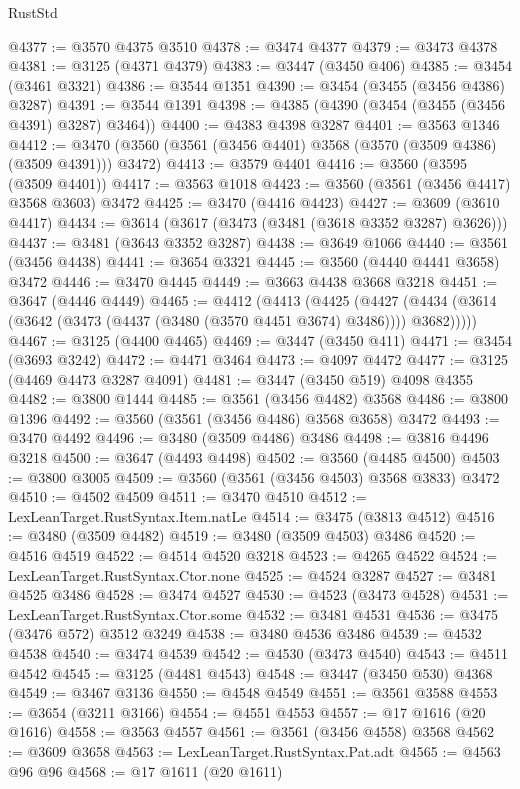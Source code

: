 \begin{lexlean}{RustStd}
\begin{coremodule}
{\begin{coremodule}
{{{{{{{{{{{{{{{{{{{{{{{{{{{{{{{{{{{{{{{{{{{{{@4377 := @3570 @4375 @3510
@4378 := @3474 @4377
@4379 := @3473 @4378
@4381 := @3125 (@4371 @4379)
@4383 := @3447 (@3450 @406)
@4385 := @3454 (@3461 @3321)
@4386 := @3544 @1351
@4390 := @3454 (@3455 (@3456 @4386) @3287)
@4391 := @3544 @1391
@4398 := @4385 (@4390 (@3454 (@3455 (@3456 @4391) @3287) @3464))
@4400 := @4383 @4398 @3287
@4401 := @3563 @1346
@4412 := @3470 (@3560 (@3561 (@3456 @4401) @3568 (@3570 (@3509 @4386) (@3509 @4391))) @3472)
@4413 := @3579 @4401
@4416 := @3560 (@3595 (@3509 @4401))
@4417 := @3563 @1018
@4423 := @3560 (@3561 (@3456 @4417) @3568 @3603) @3472
@4425 := @3470 (@4416 @4423)
@4427 := @3609 (@3610 @4417)
@4434 := @3614 (@3617 (@3473 (@3481 (@3618 @3352 @3287) @3626)))
@4437 := @3481 (@3643 @3352 @3287)
@4438 := @3649 @1066
@4440 := @3561 (@3456 @4438)
@4441 := @3654 @3321
@4445 := @3560 (@4440 @4441 @3658) @3472
@4446 := @3470 @4445
@4449 := @3663 @4438 @3668 @3218
@4451 := @3647 (@4446 @4449)
@4465 := @4412
    (@4413
      (@4425
        (@4427 (@4434 (@3614 (@3642 (@3473 (@4437 (@3480 (@3570 @4451 @3674) @3486)))) @3682)))))
@4467 := @3125 (@4400 @4465)
@4469 := @3447 (@3450 @411)
@4471 := @3454 (@3693 @3242)
@4472 := @4471 @3464
@4473 := @4097 @4472
@4477 := @3125 (@4469 @4473 @3287 @4091)
@4481 := @3447 (@3450 @519) @4098 @4355
@4482 := @3800 @1444
@4485 := @3561 (@3456 @4482) @3568
@4486 := @3800 @1396
@4492 := @3560 (@3561 (@3456 @4486) @3568 @3658) @3472
@4493 := @3470 @4492
@4496 := @3480 (@3509 @4486) @3486
@4498 := @3816 @4496 @3218
@4500 := @3647 (@4493 @4498)
@4502 := @3560 (@4485 @4500)
@4503 := @3800 @3005
@4509 := @3560 (@3561 (@3456 @4503) @3568 @3833) @3472
@4510 := @4502 @4509
@4511 := @3470 @4510
@4512 := LexLeanTarget.RustSyntax.Item.natLe
@4514 := @3475 (@3813 @4512)
@4516 := @3480 (@3509 @4482)
@4519 := @3480 (@3509 @4503) @3486
@4520 := @4516 @4519
@4522 := @4514 @4520 @3218
@4523 := @4265 @4522
@4524 := LexLeanTarget.RustSyntax.Ctor.none
@4525 := @4524 @3287
@4527 := @3481 @4525 @3486
@4528 := @3474 @4527
@4530 := @4523 (@3473 @4528)
@4531 := LexLeanTarget.RustSyntax.Ctor.some
@4532 := @3481 @4531
@4536 := @3475 (@3476 @572) @3512 @3249
@4538 := @3480 @4536 @3486
@4539 := @4532 @4538
@4540 := @3474 @4539
@4542 := @4530 (@3473 @4540)
@4543 := @4511 @4542
@4545 := @3125 (@4481 @4543)
@4548 := @3447 (@3450 @530) @4368
@4549 := @3467 @3136
@4550 := @4548 @4549
@4551 := @3561 @3588
@4553 := @3654 (@3211 @3166)
@4554 := @4551 @4553
@4557 := @17 @1616 (@20 @1616)
@4558 := @3563 @4557
@4561 := @3561 (@3456 @4558) @3568
@4562 := @3609 @3658
@4563 := LexLeanTarget.RustSyntax.Pat.adt
@4565 := @4563 @96 @96
@4568 := @17 @1611 (@20 @1611)
}}}}}}}}}}}}}}}}}}}}}}}}}}}}}}}}}}}}}}}}}}}}}
\end{coremodule}}
\end{coremodule}
\end{lexlean}
